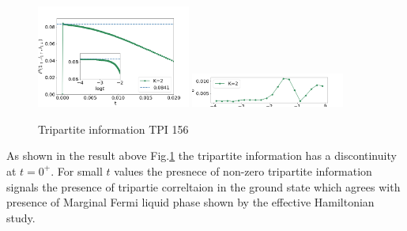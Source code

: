 \documentclass[reprint,prb,superscriptaddress]{revtex4-2}
\begin{document}
\begin{figure}
\includegraphics[width=0.45\textwidth]{plt/A_I3_ch2_[1,5,6]}
\includegraphics[width=0.45\textwidth]{plt/errorbar_A_I3_ch2_[1,5,6]}
\caption{Tripartite information TPI 156}
\label{fig:TPI_1_5_6}
\end{figure}
As shown in the result above Fig.\ref{fig:TPI_1_5_6} the tripartite information has a discontinuity at $t=0^+$. For small $t$ values the presnece of non-zero tripartite information signals the presence of tripartie correltaion in the ground state which agrees with presence of Marginal Fermi liquid phase shown by the effective Hamiltonian study.
\end{document}

